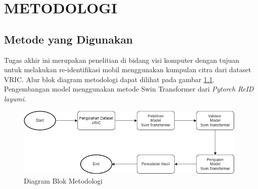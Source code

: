 \chapter{METODOLOGI}
\label{chap:metodologi}



\section{Metode yang Digunakan}
\label{sec:metodeyangdigunakan}

Tugas akhir ini merupakan penelitian di bidang visi komputer dengan tujuan untuk melakukan 
re-identifikasi mobil menggunakan kumpulan citra dari dataset VRIC. Alur blok diagram metodologi 
dapat dilihat pada gambar \ref{fig:diagramblokmetodologi}. Pengembangan model menggunakan metode 
Swin Transformer dari \emph{Pytorch ReID layumi}.

\begin{figure}[ht]
  \centering
  \includegraphics[scale=0.6]{gambar/metodologiUpdate.png}
  \caption{Diagram Blok Metodologi}
  \label{fig:diagramblokmetodologi}
\end{figure}


